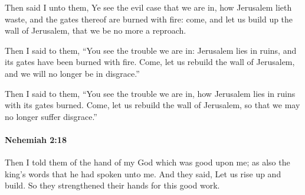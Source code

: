			\begin{versebox}
					\item[BHS] 
					\item[LXX] 
					\item[ASV] Then said I unto them, Ye see the evil case that we are in, how Jerusalem lieth waste, and the gates thereof are burned with fire: come, and let us build up the wall of Jerusalem, that we be no more a reproach.
					\item[NIV] Then I said to them, “You see the trouble we are in: Jerusalem lies in ruins, and its gates have been burned with fire. Come, let us rebuild the wall of Jerusalem, and we will no longer be in disgrace.”
					\item[NRSV] Then I said to them, “You see the trouble we are in, how Jerusalem lies in ruins with its gates burned. Come, let us rebuild the wall of Jerusalem, so that we may no longer suffer disgrace.”
			\end{versebox}

		\paragraph{Nehemiah 2:18} %
			\label{NEHEMIAH-2-18}

			Then I told them of the hand of my God which was good upon me; as also the king’s words that he had spoken unto me. And they said, Let us rise up and build. So they strengthened their hands for this good work.

